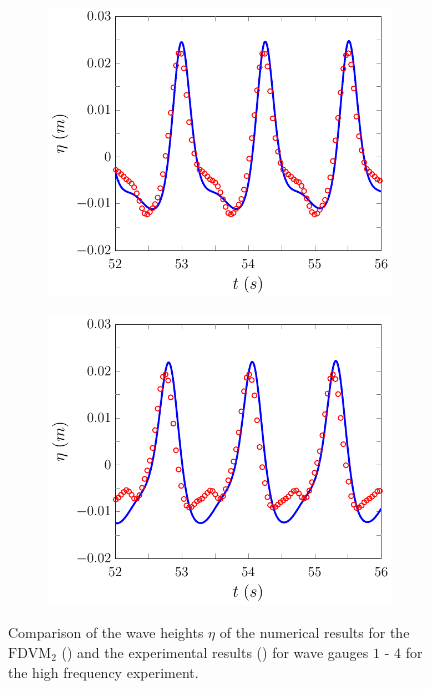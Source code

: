 \begin{figure}
\begin{subfigure}{0.5\textwidth}
		\vspace{0.5cm}
	\end{subfigure}
	\begin{subfigure}{0.5\textwidth}
		\includegraphics[width=\textwidth]{./chp6/figures/Experiment/Beji/sh/FDVMWG3.pdf}
		\vspace{0.5cm}
	\end{subfigure}%
	\begin{subfigure}{0.5\textwidth}
		\includegraphics[width=\textwidth]{./chp6/figures/Experiment/Beji/sh/FDVMWG4.pdf}
		\vspace{0.5cm}
	\end{subfigure}
	\caption{Comparison of the wave heights $\eta$ of the numerical results for the $\text{FDVM}_2$ ({\color{blue}\solidrule}) and the experimental results () for wave gauges $1$ - $4$ for the high frequency experiment.}
	\label{fig:BejishWG1to4FDVM}
\end{figure}

